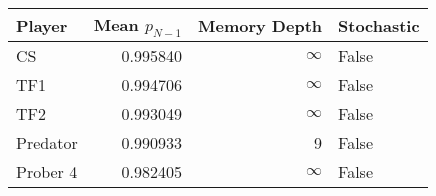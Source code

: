 \begin{tabular}{lrrl}
\toprule
   Player &  Mean $p_{N-1}$ &  Memory Depth & Stochastic \\
\midrule
       CS &        0.995840 &            \(\infty\) &      False \\
      TF1 &        0.994706 &            \(\infty\) &      False \\
      TF2 &        0.993049 &            \(\infty\) &      False \\
 Predator &        0.990933 &             9 &      False \\
 Prober 4 &        0.982405 &            \(\infty\) &      False \\
\bottomrule
\end{tabular}
